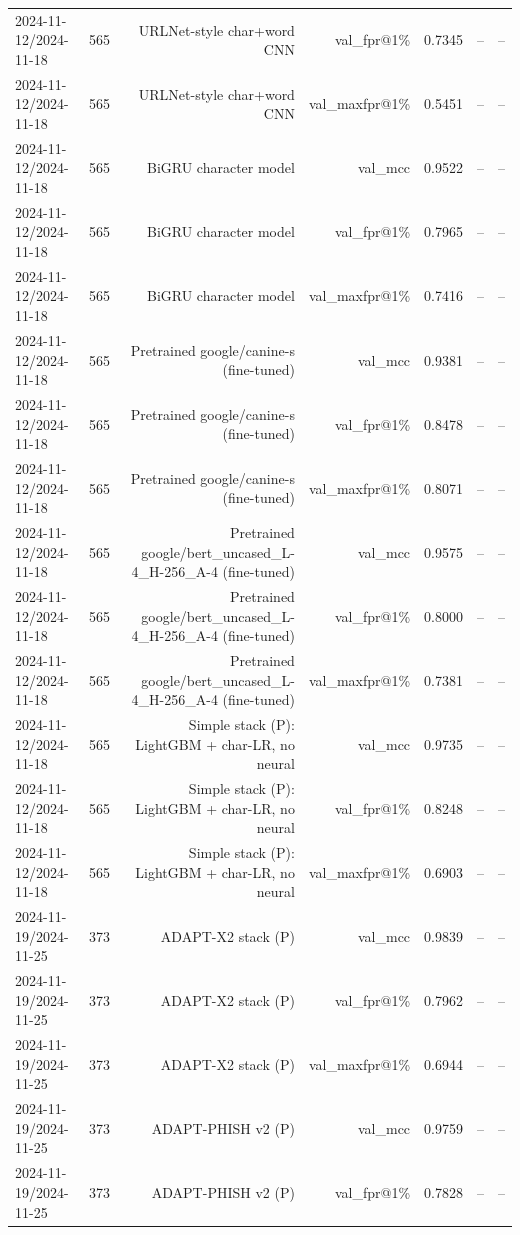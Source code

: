 \begin{table}[t]
\begin{tabular}{llrrrrr}
2024-11-12/2024-11-18 & 565 & URLNet-style char+word CNN & val\_fpr@1\% & 0.7345 & -- & -- \\
2024-11-12/2024-11-18 & 565 & URLNet-style char+word CNN & val\_maxfpr@1\% & 0.5451 & -- & -- \\
2024-11-12/2024-11-18 & 565 & BiGRU character model & val\_mcc & 0.9522 & -- & -- \\
2024-11-12/2024-11-18 & 565 & BiGRU character model & val\_fpr@1\% & 0.7965 & -- & -- \\
2024-11-12/2024-11-18 & 565 & BiGRU character model & val\_maxfpr@1\% & 0.7416 & -- & -- \\
2024-11-12/2024-11-18 & 565 & Pretrained google/canine-s (fine-tuned) & val\_mcc & 0.9381 & -- & -- \\
2024-11-12/2024-11-18 & 565 & Pretrained google/canine-s (fine-tuned) & val\_fpr@1\% & 0.8478 & -- & -- \\
2024-11-12/2024-11-18 & 565 & Pretrained google/canine-s (fine-tuned) & val\_maxfpr@1\% & 0.8071 & -- & -- \\
2024-11-12/2024-11-18 & 565 & Pretrained google/bert\_uncased\_L-4\_H-256\_A-4 (fine-tuned) & val\_mcc & 0.9575 & -- & -- \\
2024-11-12/2024-11-18 & 565 & Pretrained google/bert\_uncased\_L-4\_H-256\_A-4 (fine-tuned) & val\_fpr@1\% & 0.8000 & -- & -- \\
2024-11-12/2024-11-18 & 565 & Pretrained google/bert\_uncased\_L-4\_H-256\_A-4 (fine-tuned) & val\_maxfpr@1\% & 0.7381 & -- & -- \\
2024-11-12/2024-11-18 & 565 & Simple stack (P): LightGBM + char-LR, no neural & val\_mcc & 0.9735 & -- & -- \\
2024-11-12/2024-11-18 & 565 & Simple stack (P): LightGBM + char-LR, no neural & val\_fpr@1\% & 0.8248 & -- & -- \\
2024-11-12/2024-11-18 & 565 & Simple stack (P): LightGBM + char-LR, no neural & val\_maxfpr@1\% & 0.6903 & -- & -- \\
2024-11-19/2024-11-25 & 373 & ADAPT-X2 stack (P) & val\_mcc & 0.9839 & -- & -- \\
2024-11-19/2024-11-25 & 373 & ADAPT-X2 stack (P) & val\_fpr@1\% & 0.7962 & -- & -- \\
2024-11-19/2024-11-25 & 373 & ADAPT-X2 stack (P) & val\_maxfpr@1\% & 0.6944 & -- & -- \\
2024-11-19/2024-11-25 & 373 & ADAPT-PHISH v2 (P) & val\_mcc & 0.9759 & -- & -- \\
2024-11-19/2024-11-25 & 373 & ADAPT-PHISH v2 (P) & val\_fpr@1\% & 0.7828 & -- & -- \\

\end{tabular}
\end{table}
